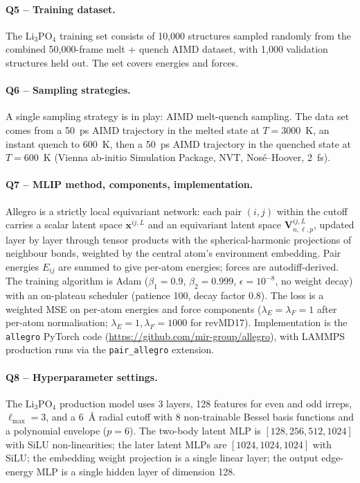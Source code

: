 \paragraph{Q5 -- Training dataset.}
The Li$_3$PO$_4$ training set consists of 10{,}000 structures
sampled randomly from the combined 50{,}000-frame melt + quench
AIMD dataset, with 1{,}000 validation structures held out. The set
covers energies and forces.


\paragraph{Q6 -- Sampling strategies.}
A single sampling strategy is in play: AIMD melt-quench sampling.
The data set comes from a 50~ps AIMD trajectory in the melted state
at $T=3000$~K, an instant quench to 600~K, then a 50~ps AIMD
trajectory in the quenched state at $T=600$~K (Vienna ab-initio
Simulation Package, NVT, Nos\'e--Hoover, 2~fs).


\paragraph{Q7 -- MLIP method, components, implementation.}
Allegro is a strictly local equivariant network: each pair $(i,j)$
within the cutoff carries a scalar latent space $\mathbf{x}^{ij,L}$
and an equivariant latent space
$\mathbf{V}^{ij,L}_{n,\ell,p}$, updated layer by layer through
tensor products with the spherical-harmonic projections of
neighbour bonds, weighted by the central atom's environment
embedding. Pair energies $E_{ij}$ are summed to give per-atom
energies; forces are autodiff-derived. The training algorithm is
Adam ($\beta_1=0.9$, $\beta_2=0.999$, $\epsilon=10^{-8}$, no weight
decay) with an on-plateau scheduler (patience 100, decay factor
0.8). The loss is a weighted MSE on per-atom energies and force
components ($\lambda_E=\lambda_F=1$ after per-atom normalisation;
$\lambda_E=1, \lambda_F=1000$ for revMD17). Implementation is the
\texttt{allegro} PyTorch code
(\url{https://github.com/mir-group/allegro}), with LAMMPS
production runs via the \texttt{pair\_allegro} extension.


\paragraph{Q8 -- Hyperparameter settings.}
The Li$_3$PO$_4$ production model uses 3 layers, 128 features for
even and odd irreps, $\ell_{\max}=3$, and a 6~\AA{} radial cutoff
with 8 non-trainable Bessel basis functions and a polynomial
envelope ($p=6$). The two-body latent MLP is
$[128, 256, 512, 1024]$ with SiLU non-linearities; the later
latent MLPs are $[1024, 1024, 1024]$ with SiLU; the embedding
weight projection is a single linear layer; the output edge-energy
MLP is a single hidden layer of dimension 128.


